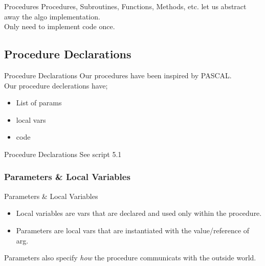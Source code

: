\begin{frame}{Procedures}
    Procedures, Subroutines, Functions, Methods, etc. let us abstract away the algo implementation.\\
    Only need to implement code once.
\end{frame}

\subsection{Procedure Declarations}
\begin{frame}{Procedure Declarations}
    Our procedures have been inspired by PASCAL.\\
    Our procedure declerations have;
    \begin{itemize}[<+->]
        \item List of params
        \item local vars
        \item code
    \end{itemize}
\end{frame}

\begin{frame}{Procedure Declarations}
    See script 5.1
\end{frame}

\subsubsection*{Parameters \& Local Variables}
\begin{frame}{Parameters \& Local Variables}
    \begin{itemize}
        \item Local variables are vars that are declared and used only within the procedure.
        \item Parameters are local vars that are instantiated with the value/reference of arg.
    \end{itemize}
    Parameters also specify \textit{how} the procedure communicats with the outside world.
\end{frame}

